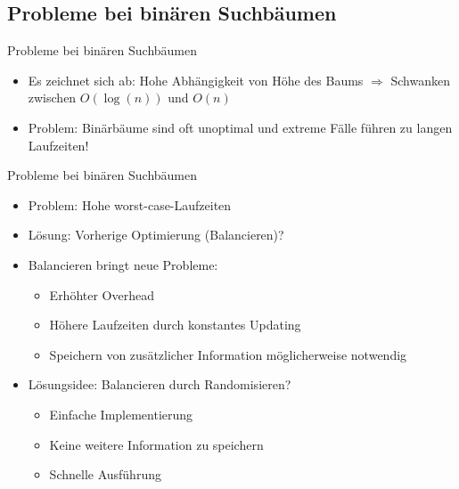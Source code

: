 \documentclass[t]{beamer}
\theoremstyle{plain}
\begin{document}
\subsection{Probleme bei binären Suchbäumen}
    \begin{frame}{Probleme bei binären Suchbäumen}
    \begin{itemize}
    \item Es zeichnet sich ab: Hohe Abhängigkeit von Höhe des Baums $\Rightarrow$ Schwanken zwischen $O(\log(n))$ und $O(n)$
    \item Problem: Binärbäume sind oft unoptimal und extreme Fälle führen zu langen Laufzeiten!
    \end{itemize}
    {}
\end{frame}

\begin{frame}{Probleme bei binären Suchbäumen}
    \begin{itemize}
    \item Problem: Hohe worst-case-Laufzeiten
    \item Lösung: Vorherige Optimierung (Balancieren)?
    \item Balancieren bringt neue Probleme:
        \begin{itemize}
        \item Erhöhter Overhead
        \item Höhere Laufzeiten durch konstantes Updating
        \item Speichern von zusätzlicher Information möglicherweise notwendig
        \end{itemize}
    \bigskip
    \item Lösungsidee: Balancieren durch Randomisieren?
    \begin{itemize}
        \item Einfache Implementierung
        \item Keine weitere Information zu speichern
        \item Schnelle Ausführung
    \end{itemize}
\end{itemize}
\end{frame}
\end{document}
